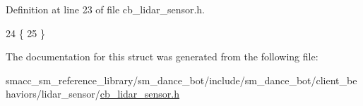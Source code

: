 Definition at line 23 of file cb\+\_\+lidar\+\_\+sensor.\+h.


\begin{DoxyCode}
24   \{
25   \}
\end{DoxyCode}


The documentation for this struct was generated from the following file\+:\begin{DoxyCompactItemize}
\item 
smacc\+\_\+sm\+\_\+reference\+\_\+library/sm\+\_\+dance\+\_\+bot/include/sm\+\_\+dance\+\_\+bot/client\+\_\+behaviors/lidar\+\_\+sensor/\hyperlink{cb__lidar__sensor_8h}{cb\+\_\+lidar\+\_\+sensor.\+h}\end{DoxyCompactItemize}
